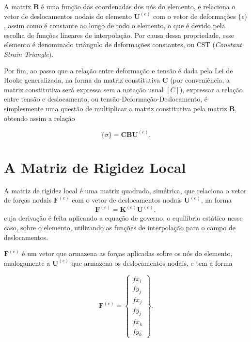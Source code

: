 A matrix $\bm{B}$ é uma função das coordenadas dos nós do elemento, e relaciona o vetor de deslocamentos nodais do elemento $\bm{U}^{(e)}$ com o vetor de deformações $\{\epsilon\}$, assim como é constante ao longo de todo o elemento, o que é devido pela escolha de funções lineares de interpolação. Por causa dessa propriedade, esse elemento é denominado triângulo de deformações constantes, ou CST (\emph{Constant Strain Triangle}).

Por fim, ao passo que a relação entre deformação e tensão é dada pela Lei de Hooke generalizada, na forma da matriz constitutiva $\bm{C}$ (por conveniência, a matriz constitutiva será expressa sem a notação usual $[C]$), expressar a relação entre tensão e deslocamento, ou tensão-Deformação-Deslocamento, é simplesmente uma questão de multiplicar a matriz constitutiva pela matriz $\bm{B}$, obtendo assim a relação

\begin{equation}
    \{\sigma\} = \bm{C} \bm{B} \bm{U}^{(e)}.
    \label{eq:relacao_tensao_deslocamento}
\end{equation}


\section{A Matriz de Rigidez Local}

A matriz de rigidez local é uma matriz quadrada, simétrica, que relaciona o vetor de forças nodais $\bm{F}^{(e)}$ com o vetor de deslocamentos nodais $\bm{U}^{(e)}$, na forma
\begin{equation}
    \bm{F}^{(e)} = \bm{K}^{(e)} \bm{U}^{(e)},
\end{equation}
cuja derivação é feita aplicando a equação de governo, o equilíbrio estático nesse caso, sobre o elemento, utilizando as funções de interpolação para o campo de deslocamentos. \cite{LOGAN}

$\bm{F}^{(e)}$ é um vetor que armazena as forças aplicadas sobre os nós do elemento, analogamente a $\bm{U}^{(e)}$ que armazena os deslocamentos nodais, e tem a forma

\begin{equation}
    \bm{F}^{(e)} = \begin{Bmatrix}
        fx_i \\ fy_j \\ fx_j \\ fy_j \\ fx_k \\ fy_k
    \end{Bmatrix}.
\end{equation}


